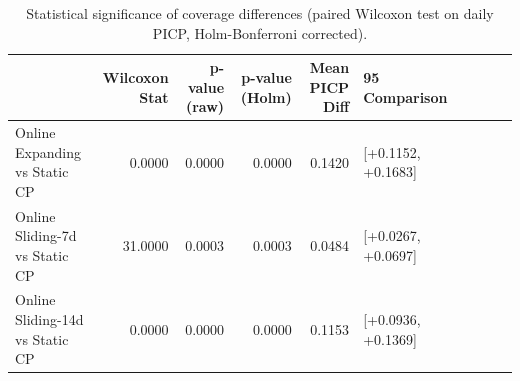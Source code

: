 \begin{table}
\caption{Statistical significance of coverage differences (paired Wilcoxon test on daily PICP, Holm-Bonferroni corrected).}
\label{tab:t55_statistical_significance}
\begin{tabular}{lrrrrl}
\toprule
 & Wilcoxon Stat & p-value (raw) & p-value (Holm) & Mean PICP Diff & 95%
Comparison &  &  &  &  &  \\
\midrule
Online Expanding vs Static CP & 0.0000 & 0.0000 & 0.0000 & 0.1420 & [+0.1152, +0.1683] \\
Online Sliding-7d vs Static CP & 31.0000 & 0.0003 & 0.0003 & 0.0484 & [+0.0267, +0.0697] \\
Online Sliding-14d vs Static CP & 0.0000 & 0.0000 & 0.0000 & 0.1153 & [+0.0936, +0.1369] \\
\bottomrule
\end{tabular}
\end{table}
